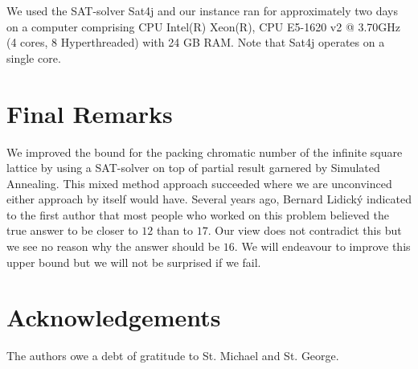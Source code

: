 \documentclass[a4paper,12pt]{article}
\theoremstyle{remark}
\begin{document}
We used the SAT-solver Sat4j and our instance ran for approximately two days on a computer comprising CPU Intel(R) Xeon(R), CPU E5-1620 v2 @ 3.70GHz (4 cores, 8 Hyperthreaded) with 24 GB RAM. Note that Sat4j operates on a single core.

\section{Final Remarks}

We improved the bound for the packing chromatic number of the infinite square lattice by using a SAT-solver on top of partial result garnered by Simulated Annealing. This mixed method approach succeeded where we are unconvinced either approach by itself would have. Several years ago, Bernard Lidick\'y indicated to the first author that most people who worked on this problem believed the true answer to be closer to $12$ than to $17$. Our view does not contradict this but we see no reason why the answer should be $16$. We will endeavour to improve this upper bound but we will not be surprised if we fail.  

\section*{Acknowledgements}

The authors owe a debt of gratitude to \mbox{St.} Michael and \mbox{St.} George.
\end{document}
